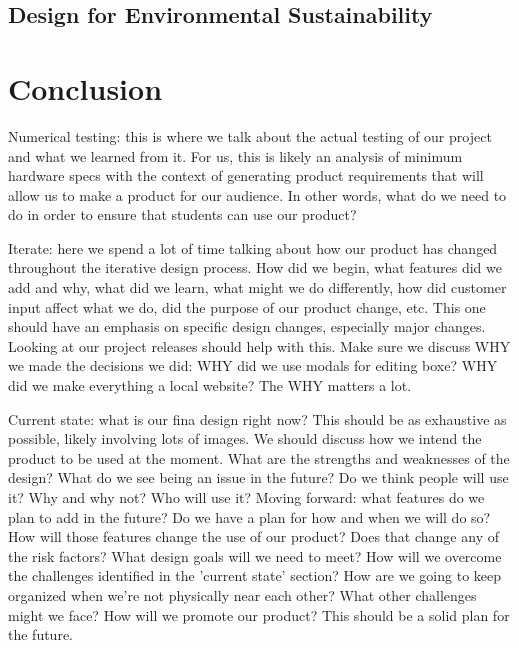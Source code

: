 \documentclass[openright]{report}
\begin{document}
\section{Design for Environmental Sustainability}

\chapter{Conclusion}

\par Numerical testing: this is where we talk about the actual testing of our project and what we learned from it. For us, this is likely an analysis of minimum hardware specs with the context of generating product requirements that will allow us to make a product for our audience. In other words, what do we need to do in order to ensure that students can use our product?

\par Iterate: here we spend a lot of time talking about how our product has changed throughout the iterative design process. How did we begin, what features did we add and why, what did we learn, what might we do differently, how did customer input affect what we do, did the purpose of our product change, etc. This one should have an emphasis on specific design changes, especially major changes. Looking at our project releases should help with this. Make sure we discuss WHY we made the decisions we did: WHY did we use modals for editing boxe? WHY did we make everything a local website? The WHY matters a lot.

\par Current state: what is our fina design right now? This should be as exhaustive as possible, likely involving lots of images. We should discuss how we intend the product to be used at the moment. What are the strengths and weaknesses of the design? What do we see being an issue in the future? Do we think people will use it? Why and why not? Who will use it? Moving forward: what features do we plan to add in the future? Do we have a plan for how and when we will do so? How will those features change the use of our product? Does that change any of the risk factors? What design goals will we need to meet? How will we overcome the challenges identified in the 'current state' section? How are we going to keep organized when we're not physically near each other? What other challenges might we face? How will we promote our product? This should be a solid plan for the future.
\end{document}
